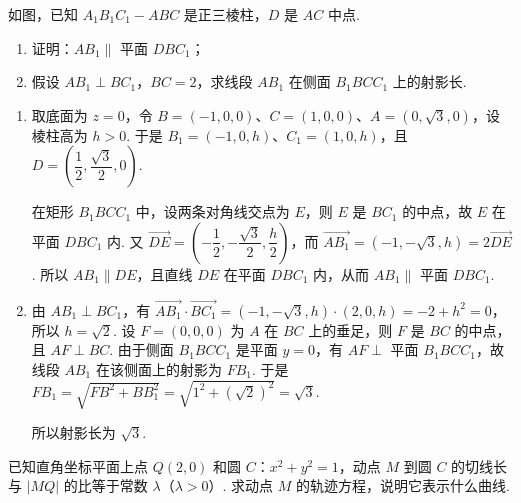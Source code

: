\begin{problem}
如图，已知 \(A_{1}B_{1}C_{1} - ABC\) 是正三棱柱，\(D\) 是 \(AC\) 中点.

\begin{enumerate}
\item 证明：\(AB_{1} \parallel\) 平面 \(DBC_{1}\)；
\item 假设 \(AB_{1} \perp BC_{1}\)，\(BC = 2\)，求线段 \(AB_{1}\) 在侧面 \(B_{1}BCC_{1}\) 上的射影长.
\end{enumerate}

\end{problem}

\begin{solution}
\begin{enumerate}
\item
取底面为 \(z=0\)，令 \(B=(-1,0,0)\)、\(C=(1,0,0)\)、\(A=(0,\sqrt3,0)\)，设棱柱高为 \(h>0\). 于是 \(B_1=(-1,0,h)\)、\(C_1=(1,0,h)\)，且 \(D=\left(\dfrac12,\dfrac{\sqrt3}{2},0\right)\).

在矩形 \(B_1BCC_1\) 中，设两条对角线交点为 \(E\)，则 \(E\) 是 \(BC_1\) 的中点，故 \(E\) 在平面 \(DBC_1\) 内. 又
\(\overrightarrow{DE}=\left(-\dfrac12,-\dfrac{\sqrt3}{2},\dfrac h2\right)\)，而 \(\overrightarrow{AB_1}=\left(-1,-\sqrt3,h\right)=2\overrightarrow{DE}\). 所以 \(AB_1\parallel DE\)，且直线 \(DE\) 在平面 \(DBC_1\) 内，从而 \(AB_1\parallel\) 平面 \(DBC_1\).

 \item
由 \(AB_1\perp BC_1\)，有 \(\overrightarrow{AB_1}\cdot\overrightarrow{BC_1}=(-1,-\sqrt3,h)\cdot(2,0,h)=-2+h^2=0\)，所以 \(h=\sqrt2\). 设 \(F=(0,0,0)\) 为 \(A\) 在 \(BC\) 上的垂足，则 \(F\) 是 \(BC\) 的中点，且 \(AF\perp BC\). 由于侧面 \(B_1BCC_1\) 是平面 \(y=0\)，有 \(AF\perp\) 平面 \(B_1BCC_1\)，故线段 \(AB_1\) 在该侧面上的射影为 \(FB_1\). 于是
\(FB_1=\sqrt{FB^2+BB_1^2}=\sqrt{1^2+(\sqrt2)^2}=\sqrt3\).

所以射影长为 \(\sqrt3\).
\end{enumerate}
\end{solution}

\begin{problem}
已知直角坐标平面上点 \(Q(2,0)\) 和圆 \(C\)：\(x^{2} + y^{2} = 1\)，动点 \(M\) 到圆 \(C\) 的切线长与 \(|MQ|\) 的比等于常数 \(\lambda\)（\(\lambda > 0\)）. 求动点 \(M\) 的轨迹方程，说明它表示什么曲线.
\end{problem}

